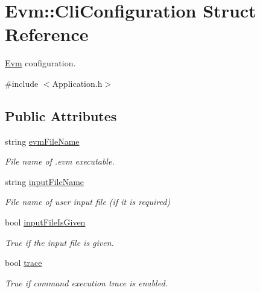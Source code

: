 \hypertarget{struct_evm_1_1_cli_configuration}{}\section{Evm\+:\+:Cli\+Configuration Struct Reference}
\label{struct_evm_1_1_cli_configuration}


\mbox{\hyperlink{namespace_evm}{Evm}} configuration.  




{\ttfamily \#include $<$Application.\+h$>$}

\subsection*{Public Attributes}
\begin{DoxyCompactItemize}
\item 
\mbox{\label{struct_evm_1_1_cli_configuration_aa63df356e835bc53792a7af4125945a9}} 
string \mbox{\hyperlink{struct_evm_1_1_cli_configuration_aa63df356e835bc53792a7af4125945a9}{evm\+File\+Name}}
\begin{DoxyCompactList}\small\item\em File name of .evm executable. \end{DoxyCompactList}\item 
\mbox{\label{struct_evm_1_1_cli_configuration_a98c1b5af8263e6208ec9b2bc2cfe595e}} 
string \mbox{\hyperlink{struct_evm_1_1_cli_configuration_a98c1b5af8263e6208ec9b2bc2cfe595e}{input\+File\+Name}}
\begin{DoxyCompactList}\small\item\em File name of user input file (if it is required) \end{DoxyCompactList}\item 
\mbox{\label{struct_evm_1_1_cli_configuration_adb445455ca905fb6dccb0c212f46ce51}} 
bool \mbox{\hyperlink{struct_evm_1_1_cli_configuration_adb445455ca905fb6dccb0c212f46ce51}{input\+File\+Is\+Given}}
\begin{DoxyCompactList}\small\item\em True if the input file is given. \end{DoxyCompactList}\item 
\mbox{\label{struct_evm_1_1_cli_configuration_a0a296d97c4674e4f2460ffb85263552a}} 
bool \mbox{\hyperlink{struct_evm_1_1_cli_configuration_a0a296d97c4674e4f2460ffb85263552a}{trace}}
\begin{DoxyCompactList}\small\item\em True if command execution trace is enabled. \end{DoxyCompactList}\end{DoxyCompactItemize}


